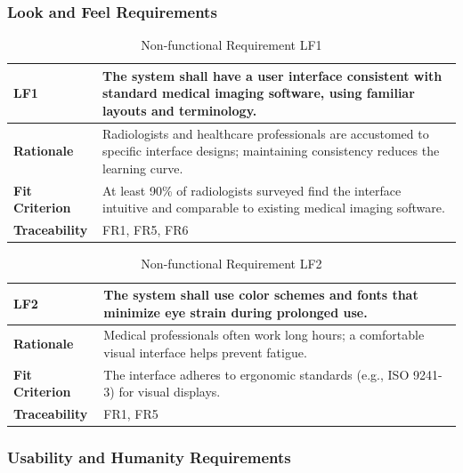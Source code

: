 \documentclass[12pt]{article}
\begin{document}
\subsubsection{Look and Feel Requirements}

\begin{table}[h!]
\centering
{}
\begin{tabular}{|p{3.5cm}|p{11.5cm}|}
\hline
\rowcolor{gray!30}
\textbf{LF1} & The system shall have a user interface consistent with standard medical imaging software, using familiar layouts and terminology. \\
\hline
\textbf{Rationale} & Radiologists and healthcare professionals are accustomed to specific interface designs; maintaining consistency reduces the learning curve. \\
\hline
\textbf{Fit Criterion} & At least 90\% of radiologists surveyed find the interface intuitive and comparable to existing medical imaging software. \\
\hline
\textbf{Traceability} & FR1, FR5, FR6 \\
\hline
\end{tabular}
\caption{Non-functional Requirement LF1}
\end{table}

\begin{table}[h!]
\centering
{}
\begin{tabular}{|p{3.5cm}|p{11.5cm}|}
\hline
\rowcolor{gray!30}
\textbf{LF2} & The system shall use color schemes and fonts that minimize eye strain during prolonged use. \\
\hline
\textbf{Rationale} & Medical professionals often work long hours; a comfortable visual interface helps prevent fatigue. \\
\hline
\textbf{Fit Criterion} & The interface adheres to ergonomic standards (e.g., ISO 9241-3) for visual displays. \\
\hline
\textbf{Traceability} & FR1, FR5 \\
\hline
\end{tabular}
\caption{Non-functional Requirement LF2}
\end{table}
\newpage
\subsubsection{Usability and Humanity Requirements}
\end{document}
